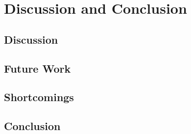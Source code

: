\chapter{Discussion and Conclusion}

\section{Discussion}



\section{Future Work}


\section{Shortcomings}



\section{Conclusion}
